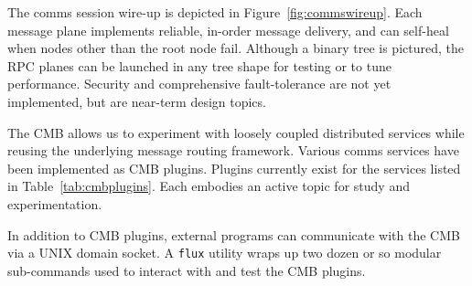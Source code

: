 The comms session wire-up is depicted in Figure~\ref{fig:commswireup}.
Each message plane implements reliable, in-order message delivery, and
can self-heal when nodes other than the root node fail.
Although a binary tree is pictured, the RPC planes can be launched in
any tree shape for testing or to tune performance.
Security and comprehensive fault-tolerance are not yet implemented,
but are near-term design topics.

The CMB allows us to experiment with loosely coupled distributed services
while reusing the underlying message routing framework.  Various comms
services have been implemented as CMB plugins.  Plugins currently exist for
the services listed in Table~\ref{tab:cmbplugins}.
Each embodies an active topic for study and experimentation. %

In addition to CMB plugins, external programs can communicate with the CMB
via a UNIX domain socket.  A {\tt flux} utility wraps up two dozen or so
modular sub-commands used to interact with and test the CMB plugins.

